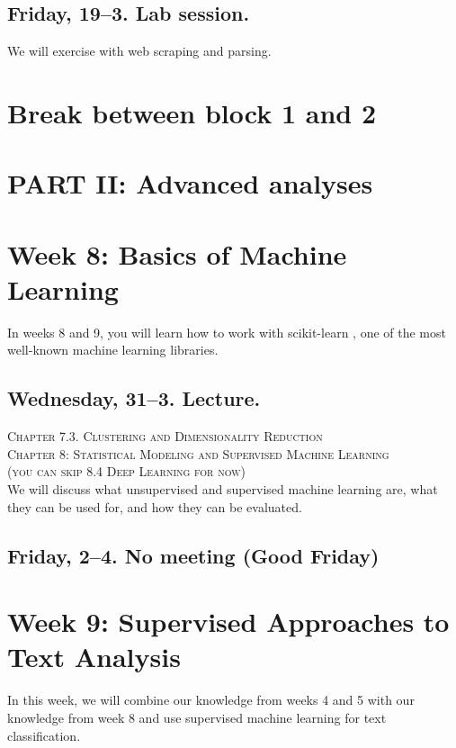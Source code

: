\subsection*{Friday, 19--3. Lab session.}
We will exercise with web scraping and parsing.







\section*{Break between block 1 and 2}

\section*{PART II: Advanced analyses}


\section*{Week 8: Basics of Machine Learning}
In weeks 8 and 9, you will learn how to work with scikit-learn \citep{scikit-learn}, one of the most well-known machine learning libraries.


\subsection*{Wednesday, 31--3. Lecture.}
\textsc{ Chapter 7.3. Clustering and Dimensionality Reduction}\\
\textsc{ Chapter 8: Statistical Modeling and Supervised Machine Learning}\\
\textsc{ (you can skip 8.4 Deep Learning for now)}\\

We will discuss what unsupervised and supervised machine learning are, what they can be used for, and how they can be evaluated.


\subsection*{Friday, 2--4. No meeting (Good Friday)}



\section*{Week 9: Supervised Approaches to Text Analysis}
In this week, we will combine our knowledge from weeks 4 and 5 with our knowledge from week 8 and use supervised machine learning for text classification.

